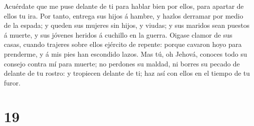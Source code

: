 Acuérdate que me puse delante de ti para hablar bien por ellos, para
apartar de ellos tu ira.  Por tanto, entrega sus hijos á
hambre, y hazlos derramar por medio de la espada; y queden sus mujeres
sin hijos, y viudas; y sus maridos sean puestos á muerte, y sus jóvenes
heridos á cuchillo en la guerra.  Oigase clamor de sus
casas, cuando trajeres sobre ellos ejército de repente: porque cavaron
hoyo para prenderme, y á mis pies han escondido lazos.  Mas
tú, oh Jehová, conoces todo su consejo contra mí para muerte; no
perdones su maldad, ni borres su pecado de delante de tu rostro: y
tropiecen delante de ti; haz así con ellos en el tiempo de tu furor.

\hypertarget{section-18}{%
\section{19}\label{section-18}}


